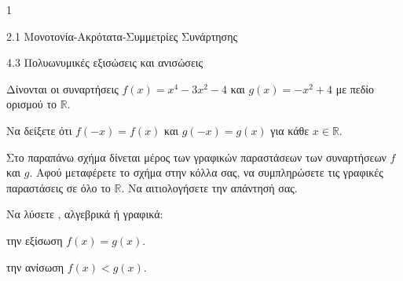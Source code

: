\begin{ylh}{1}
\item 2.1 Μονοτονία-Ακρότατα-Συμμετρίες Συνάρτησης
\item 4.3 Πολυωνυμικές εξισώσεις και ανισώσεις
\end{ylh}
Δίνονται οι συναρτήσεις $f(x) = x^4 - 3x^2 - 4$ και $g(x) = -x^2 + 4$ με πεδίο ορισμού το $\mathbb{R}$.
\begin{alist}
\item Να δείξετε ότι $f(-x) = f(x)$ και $g(-x) = g(x)$ για κάθε $x \in \mathbb{R}$. 
\begin{center}
\end{center}
\item Στο παραπάνω σχήμα δίνεται μέρος των γραφικών παραστάσεων των συναρτήσεων $f$ και $g$.
Αφού μεταφέρετε το σχήμα στην κόλλα σας, να συμπληρώσετε τις γραφικές παραστάσεις σε όλο το $\mathbb{R}$. Να αιτιολογήσετε την απάντησή σας. 
\item Να λύσετε , αλγεβρικά ή γραφικά:
\begin{rlist}
\item την εξίσωση $f(x) = g(x)$. 
\item την ανίσωση $f(x) < g(x)$. 
\end{rlist}
\end{alist}

